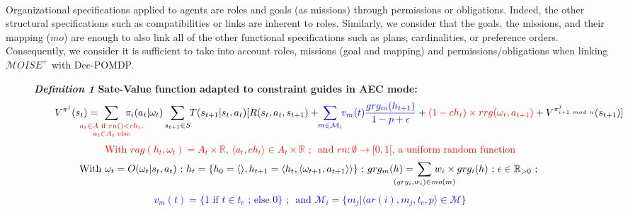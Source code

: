 \documentclass[sigconf]{aamas}
\begin{document}
\

\noindent Organizational specifications applied to agents are roles and goals (as missions) through permissions or obligations. Indeed, the other structural specifications such as compatibilities or links are inherent to roles. Similarly, we consider that the goals, the missions, and their mapping ($mo$) are enough to also link all of the other functional specifications such as plans, cardinalities, or preference orders.
Consequently, we consider it is sufficient to take into account roles, missions (goal and mapping) and permissions/obligations when linking $\mathcal{M}OISE^+$ with Dec-POMDP.

\begin{figure}[t]
  \label{eq:single_value_function}
  \raggedright
  \textbf{\textit{Definition 1} \quad Sate-Value function adapted to constraint guides in AEC mode:}
  \begin{gather*}
    \text{\quad \quad} V^{\pi^j}(s_t) = \hspace{-0.75cm} \sum_{\textcolor{red}{ \substack{a_{t} \in A \text{ if } rn() < ch_{t}, \\
          a_{t} \in A_{t} \text{ else}}
      }}{\hspace{-0.7cm} \pi_i(a_{t} | \omega_t)} \sum_{s_{t+1} \in S}{\hspace{-0.1cm} T(s_{t+1} | s_t, a_{t})[R(s_t,a_{t},s_{t+1}) + \hspace{-0.1cm} \textcolor{blue}{ \sum_{m \in \mathcal{M}_i}{ \hspace{-0.1cm} v_m(t) \frac{grg_m(h_{t+1})}{1 - p + \epsilon} } } + \textcolor{red}{(1-ch_t) \times rrg(\omega_t,a_{t+1})} + V^{\pi^j_{i+1 \ mod \ n}}(s_{t+1})]}
  \end{gather*}
  \textcolor{red}{\[\text{With } rag(h_t, \omega_t) = A_{t} \times \mathbb{R} \text{, } \langle a_t, ch_{t} \rangle \in A_{t} \times \mathbb{R} \text{ ; } \text{ and } rn: \emptyset \to [0,1[ \text{, a uniform random function}\]}
  \vspace{-0.5cm}
  \textcolor{blue}{
    \begin{gather*}
      \text{With } \omega_t = O(\omega_t | s_t, a_t) \text{ ; } h_t = \{h_0 = \langle \rangle, h_{t+1} = \langle h_t, \langle \omega_{t+1}, a_{t+1} \rangle \rangle \} \text{ ; } grg_m(h) = \hspace{-0.8cm} \sum_{(grg_i,w_i) \in mo(m)}{\hspace{-0.8cm} w_i \times grg_i(h)} \text{ ; } \epsilon \in \mathbb{R}_{>0} \text{ ; }
    \end{gather*}
  }
  \vspace{-0.75cm}
  \textcolor{blue}{
    \begin{gather*}
      v_m(t) = \{ 1 \text{ if } t \in t_c \text{ ; else } 0 \} \text{ ; } \text{ and } \mathcal{M}_i = \{m_j | \langle ar(i),m_j,t_c,p \rangle \in \mathcal{M}\}
    \end{gather*}
  }
  \vspace{-0.6cm}
\end{figure}
\end{document}
